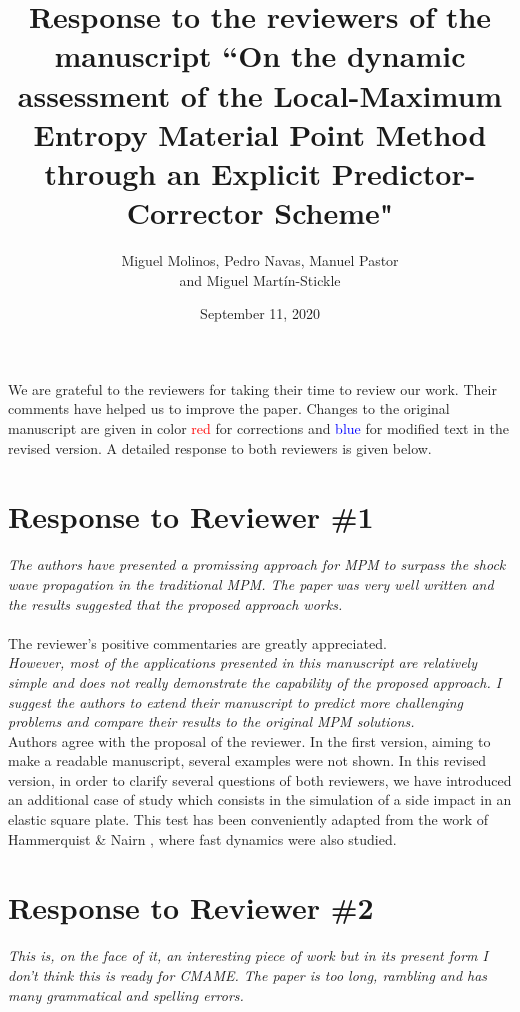 \documentclass[12pt]{article}
\title{Response to the reviewers of the manuscript ``On the dynamic assessment of the Local-Maximum Entropy Material Point Method through an Explicit Predictor-Corrector Scheme"}
\author{Miguel Molinos, Pedro Navas, Manuel Pastor\\
and Miguel Mart\'in-Stickle}
\date{September 11, 2020}
\begin{document}
\maketitle

We  are grateful to the reviewers for taking their time  to review our work. Their comments have helped us to improve the paper. Changes to the original manuscript are given in  color \textcolor{red}{red} for corrections and  \textcolor{blue}{blue} for modified text in the revised version.  A detailed response to both reviewers is given below.

\section*{Response to Reviewer \#1}
{\it
The authors have presented a promissing approach for MPM to surpass the shock wave propagation in the traditional MPM. The paper was very well written and the results suggested that the proposed approach works.
}
\\
\\
The reviewer's positive commentaries are greatly appreciated.
\\

\textit{However, most of the applications presented in this manuscript are relatively simple and does not really demonstrate the capability of the proposed approach. I suggest the authors to extend their manuscript to predict more challenging problems and compare their results to the original MPM solutions.}\\

Authors agree with the proposal of the reviewer. In the first version, aiming to make a readable manuscript, several examples were not shown. In this revised version, in order to clarify several questions of both reviewers, we have introduced an additional case of study which consists in the simulation of a side impact in an elastic square plate. This test has been conveniently adapted from the work of Hammerquist \& Nairn \cite{HAMMERQUIST2017724}, where fast dynamics were also studied.

\hspace{5mm}



\section*{Response to Reviewer \#2}

\textit {This is, on the face of it, an interesting piece of work but in its present form I don't think this is ready for CMAME. The paper is too long, rambling and has many grammatical and spelling errors. }\\
\end{document}
